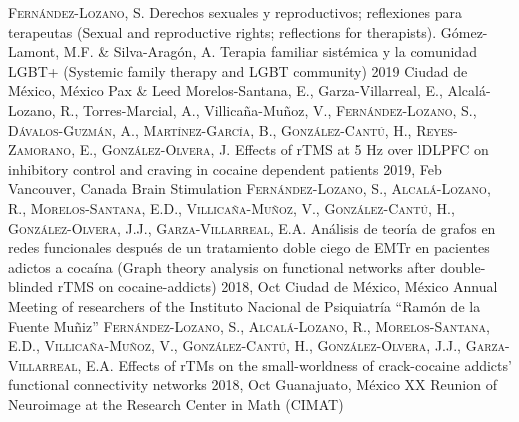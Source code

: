 \vspace{-3mm}
{
\setlength\tabcolsep{0pt} \setlength{\extrarowheight}{0pt}%
\begin{itemize}[leftmargin=5ex, nosep, noitemsep, itemindent=-13pt,
    label=\raisebox{0.25ex}{\tiny$\bullet$}]%
    \vspace{-1.8mm}%
    \cvchapt
        {\scshape{Fernández-Lozano, S.}}
        {Derechos sexuales y reproductivos; reflexiones para terapeutas
        (Sexual and reproductive rights; reflections for therapists).}
        {Gómez-Lamont, M.F. \& Silva-Aragón, A.}
        {Terapia familiar sistémica y la comunidad LGBT+ (Systemic family therapy and
        LGBT community)}
        {2019}
        {Ciudad de México, México}
        {Pax \& Leed}
    \cvposter
        {Morelos-Santana, E., Garza-Villarreal, E., Alcalá-Lozano, R.,
            Torres-Marcial, A., Villicaña-Muñoz, V., \scshape{Fernández-Lozano,
            S.}, Dávalos-Guzmán, A., Martínez-García, B., González-Cantú, H.,
            Reyes-Zamorano, E., González-Olvera, J.}
        {Effects of rTMS at 5 Hz over lDLPFC on inhibitory control and craving
            in cocaine dependent patients}
        {2019, Feb}
        {Vancouver, Canada}
        {Brain Stimulation}
    \cvposter
        {\scshape{Fernández-Lozano, S.}, Alcalá-Lozano, R., Morelos-Santana, E.D.,
            Villicaña-Muñoz, V., González-Cantú, H., González-Olvera, J.J.,
        Garza-Villarreal, E.A.}
        {Análisis de teoría de grafos en redes funcionales después de un
            tratamiento doble ciego de EMTr en pacientes adictos a cocaína
            (Graph theory analysis on functional networks after double-blinded
        rTMS on cocaine-addicts)}
        {2018, Oct}
        {Ciudad de México, México}
        {Annual Meeting of researchers of the Instituto Nacional de Psiquiatría ``Ramón de la Fuente Muñiz''}
    \cvposter
        {\scshape{Fernández-Lozano, S.}, Alcalá-Lozano, R., Morelos-Santana, E.D.,
            Villicaña-Muñoz, V., González-Cantú, H., González-Olvera, J.J.,
        Garza-Villarreal, E.A.}
        {Effects of rTMs on the small-worldness of crack-cocaine addicts' functional connectivity networks}
        {2018, Oct}
        {Guanajuato, México}
        {XX Reunion of Neuroimage at the Research Center in Math (CIMAT)}
\end{itemize}
}

